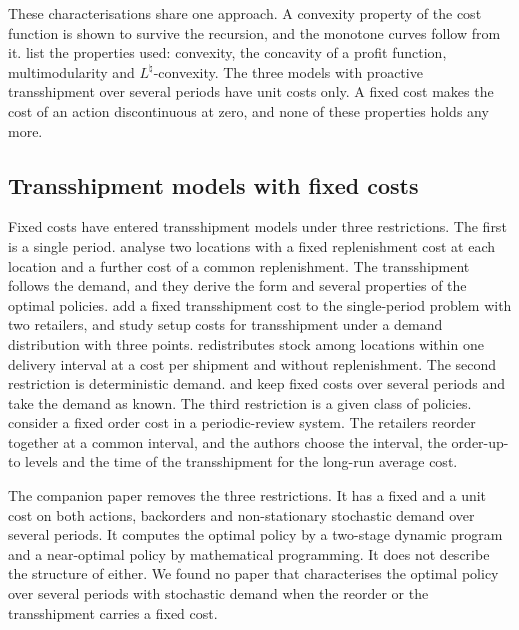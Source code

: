 \documentclass[11pt]{article}
\theoremstyle{definition}
\begin{document}
These characterisations share one approach. A convexity property of the cost function is shown to survive the recursion, and the monotone curves follow from it. \citet{xu2023optimal} list the properties used: convexity, the concavity of a profit function, multimodularity and $L^{\natural}$-convexity. The three models with proactive transshipment over several periods have unit costs only. A fixed cost makes the cost of an action discontinuous at zero, and none of these properties holds any more.

\subsection{Transshipment models with fixed costs}

Fixed costs have entered transshipment models under three restrictions. The first is a single period. \citet{herer1999lateral} analyse two locations with a fixed replenishment cost at each location and a further cost of a common replenishment. The transshipment follows the demand, and they derive the form and several properties of the optimal policies. \citet{noham2014single} add a fixed transshipment cost to the single-period problem with two retailers, and \citet{liang2014inventory} study setup costs for transshipment under a demand distribution with three points. \citet{allen1961redistribution} redistributes stock among locations within one delivery interval at a cost per shipment and without replenishment. The second restriction is deterministic demand. \citet{herer2001dynamic} and \citet{herer2003optimal} keep fixed costs over several periods and take the demand as known. The third restriction is a given class of policies. \citet{zhou2023replenishment} consider a fixed order cost in a periodic-review system. The retailers reorder together at a common interval, and the authors choose the interval, the order-up-to levels and the time of the transshipment for the long-run average cost.

The companion paper \citep{ma2026computational} removes the three restrictions. It has a fixed and a unit cost on both actions, backorders and non-stationary stochastic demand over several periods. It computes the optimal policy by a two-stage dynamic program and a near-optimal policy by mathematical programming. It does not describe the structure of either. We found no paper that characterises the optimal policy over several periods with stochastic demand when the reorder or the transshipment carries a fixed cost.
\end{document}

